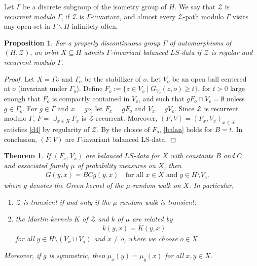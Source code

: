 \documentclass[12pt,a4paper]{amsart}
\numberwithin{equation}{section}
\newtheorem{prop}[equation]{Proposition}
\newtheorem{thm}[equation]{Theorem}
\theoremstyle{definition}
\begin{document}
Let $\Gamma$ be a discrete subgroup of the isometry group of $H$. We say that $\mathcal Z$ is \textit{recurrent modulo $\Gamma$}, if $\mathcal Z$ is $\Gamma$-invariant, and almost every $\mathcal Z$-path modulo $\Gamma$ visits any open set in $\Gamma\backslash H$ infinitely often. 

\begin{prop}\label{propad}
For a properly discontinuous group $\Gamma$ of automorphisms of $(H,\mathcal{Z})$,
an orbit $X\subseteq H$ admits $\Gamma$-invariant balanced $LS$-data if $\mathcal{Z}$ is regular and recurrent modulo $\Gamma$.
\end{prop}

\begin{proof}
Let $X=\Gamma o$ and $\Gamma_{o}$ be the stabilizer of $o$.
Let $V_{o}$ be an open ball centered at $o$ (invariant under $\Gamma_{o}$). Define $F_{o}:=\{z\in V_{o}\mid G_{V_{o}}(z,o) \geq t\}$, for $t>0$ large enough that $F_{o}$ is compactly contained in $V_{o}$, and such that $gF_{o}\cap V_{o}=\emptyset$ unless $g\in\Gamma_{o}$. 
For $g\in\Gamma$ and $x=go$, let $F_{x}=gF_{o}$ and $V_{x}=gV_{o}$.
Since $\mathcal{Z}$ is recurrent modulo $\Gamma$, $F=\cup_{x\in X}F_x$ is $\mathcal{Z}$-recurrent.
Moreover, $(F,V)=(F_x,V_x)_{x\in X}$ satisfies \ref{d4} by regularity of $\mathcal Z$. 
By the choice of $F_o$, \ref{balan} holds for $B = t$.
In conclusion, $(F,V)$ are $\Gamma$-invariant balanced LS-data.
\end{proof}

\begin{thm}\label{Green}
If $(F_x,V_x)$ are balanced $LS$-data for $X$ with constants $B$ and $C$ and associated family $\mu$ of probability measures on $X$, then
\begin{align*}
	G(y,x) = BCg(y,x)
	\quad\text{for all $x\in X$ and $y\in H\setminus V_x$},
\end{align*}
where $g$ denotes the Green kernel of the $\mu$-random walk on $X$.
In particular, 
\begin{enumerate}
    \item $\mathcal{Z}$ is transient if and only if the $\mu$-random walk is transient;
    \item the Martin kernels $K$ of $\mathcal{Z}$ and $k$ of $\mu$ are related by
    \begin{align*}
        k(y,x)=K(y,x)
    \end{align*}
    for all $y\in H\setminus (V_x \cup V_o)$ and $x\ne o$, where we choose $o\in X$.
\end{enumerate}
Moreover, if $g$ is symmetric, then $\mu_{x}(y) = \mu_{y}(x)$ for all $x,y \in X$.
\end{thm}
\end{document}
